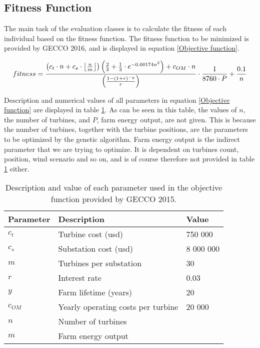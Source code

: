 \subsection{Fitness Function}\label{subsection:fitness function}
The main task of the evaluation classes is to calculate the fitness of each individual based on the fitness function.  The fitness function to be minimized is provided by GECCO 2016, and is displayed in equation \ref{Objective function}.\\

\begin{small}
\begin{equation}
fitness =  \frac{ \left( c_t \cdot n + c_s \cdot \floor*{\frac{n}{m}} \right) \left( \frac{2}{3} + \frac{1}{3} \cdot e^{-0.00174n^2} \right) + c_{OM} \cdot n}{\left( \frac{1 - (1 + r)^{-y}}{r} \right) } \cdot \frac{1}{8760 \cdot P} + \frac{0.1}{n}
\label{Objective function} 
\end{equation}
\end{small}


\noindent Description and numerical values of all parameters in equation \ref{Objective function} are displayed in table \ref{Parameters}. As can be seen in this table, the values of $n$, the number of turbines, and $P$, farm energy output, are not given. This is because the number of turbines, together with the turbine positions, are the parameters to be optimized by the genetic algorithm. Farm energy output is the indirect parameter that we are trying to optimize. It is dependent on turbines count, position, wind scenario and so on, and is of course therefore not provided in table \ref{Parameters} either.\\


\begin{table}[h!]
\begin{center}
\caption{Description and value of each parameter used in the objective function provided by GECCO 2015.}
\label{Parameters}
\begin{tabular}{l|l|l}
\textbf{Parameter} & \textbf{Description} & \textbf{Value} \\ 
\hline 
$c_t$ & Turbine cost (usd) & 750 000 \\ 
$c_s$ & Substation cost (usd) & 8 000 000 \\ 
$m$ & Turbines per substation & 30 \\ 
$r$ & Interest rate & 0.03 \\ 
$y$ & Farm lifetime (years) & 20 \\ 
$c_{OM}$ & Yearly operating costs per turbine & 20 000 \\ 
$n$ & Number of turbines &  \\ 
$m$ & Farm energy output &  \\  
\end{tabular} 
\end{center}
\end{table}



